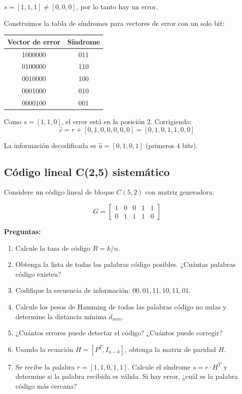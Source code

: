 \documentclass[10pt,a4paper]{article}
\begin{document}
\begin{solucion}
$s = [1,1,1] \neq [0,0,0]$, por lo tanto hay un error.

Construimos la tabla de síndromes para vectores de error con un solo bit:

\begin{center}
\begin{tabular}{|c|c|}
\hline
Vector de error & Síndrome \\
\hline
1000000 & 011 \\
0100000 & 110 \\
0010000 & 100 \\
0001000 & 010 \\
0000100 & 001 \\
\hline
\end{tabular}
\end{center}

Como $s = [1,1,0]$, el error está en la posición 2. Corrigiendo:
\[
\hat{c} = r + [0,1,0,0,0,0,0] = [0,1,0,1,1,0,0]
\]

La información decodificada es $\hat{u} = [0,1,0,1]$ (primeros 4 bits).
\end{solucion}

\subsection{Código lineal C(2,5) sistemático}

\begin{ejercicio}
Considere un código lineal de bloque $C(5, 2)$ con matriz generadora:

\[
G = \begin{bmatrix}
1 & 0 & 0 & 1 & 1 \\
0 & 1 & 1 & 1 & 0
\end{bmatrix}
\]

\textbf{Preguntas:}
\begin{enumerate}
\item Calcule la tasa de código $R = k/n$.
\item Obtenga la lista de todas las palabras código posibles. ¿Cuántas palabras código existen?
\item Codifique la secuencia de información: $00, 01, 11, 10, 11, 01$.
\item Calcule los pesos de Hamming de todas las palabras código no nulas y determine la distancia mínima $d_{min}$.
\item ¿Cuántos errores puede detectar el código? ¿Cuántos puede corregir?
\item Usando la ecuación $H = [P^T, I_{n-k}]$, obtenga la matriz de paridad $H$.
\item Se recibe la palabra $r = [1, 1, 0, 1, 1]$. Calcule el síndrome $s = r \cdot H^T$ y determine si la palabra recibida es válida. Si hay error, ¿cuál es la palabra código más cercana?
\end{enumerate}
\end{ejercicio}
\end{document}
